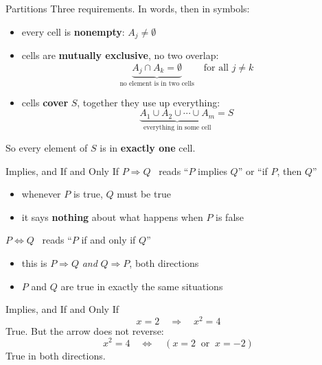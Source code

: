 \begin{frame}{Partitions}
Three requirements. In words, then in symbols:
\bsk
\begin{itemize}
    \item every cell is \textbf{nonempty}: \hspace{0.3in} $A_j\ne\emptyset$
    \bsk
    \item cells are \textbf{mutually exclusive}, no two overlap:
    $$\underbrace{A_j\cap A_k=\emptyset}_{\text{no element is in two cells}}
      \quad\text{for all } j\ne k$$
    \item cells \textbf{cover} $S$, together they use up everything:
    $$\underbrace{A_1\cup A_2\cup\cdots\cup A_m}_{\text{everything in some cell}}=S$$
\end{itemize}
\vfill
So every element of $S$ is in \textbf{exactly one} cell. \vspace{0.4in}
\end{frame}

\begin{frame}{Implies, and If and Only If}
$P\Rightarrow Q$ \ reads ``$P$ implies $Q$'' or ``if $P$, then $Q$''
\begin{itemize}
    \item whenever $P$ is true, $Q$ must be true
    \item it says \textbf{nothing} about what happens when $P$ is false
\end{itemize}
\bsk
$P\Leftrightarrow Q$ \ reads ``$P$ if and only if $Q$''
\begin{itemize}
    \item this is $P\Rightarrow Q$ \textit{and} $Q\Rightarrow P$, both directions
    \item $P$ and $Q$ are true in exactly the same situations
\end{itemize}
\vfill
\end{frame}

\begin{frame}{Implies, and If and Only If}
$$x=2 \quad\Longrightarrow\quad x^2=4$$
\bsk
True. But the arrow does not reverse: \vspace{0.5in}
\bsk
$$x^2=4 \quad\Longleftrightarrow\quad (x=2 \ \text{ or } \ x=-2)$$
\bsk
True in both directions. \vspace{0.5in}
\vfill
\end{frame}

